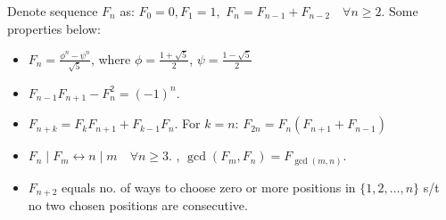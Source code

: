 Denote sequence $F_n$ as: $F_0 = 0, F_1 = 1,$
$F_n = F_{n - 1} + F_{n - 2} \quad \forall n \ge 2$. Some properties below:

\begin{itemize}
    \item $\displaystyle 
            F_n = \frac{\phi^n - \psi^n}{\sqrt{5}}$,
    where \(\phi = \frac{1 + \sqrt{5}}{2}\), \(\psi = \frac{1 - \sqrt{5}}{2}\)

    \item $F_{n - 1}F_{n + 1} - F_n^2 = (-1)^n$.

    \item $F_{n + k} = F_kF_{n + 1} + F_{k-1}F_n$. For $k=n$: $F_{2n} = F_n(F_{n + 1} + F_{n - 1})$

    \item $F_n \mid F_m \leftrightarrow n \mid m \quad \forall n \geq 3$.
        , $\gcd(F_m, F_n) = F_{\gcd(m, n)}.$

    \item $F_{n+2}$ equals no. of ways to choose zero or more positions in $\{1, 2, \dotsc, n\}$ s/t no two chosen positions are consecutive.
\end{itemize}